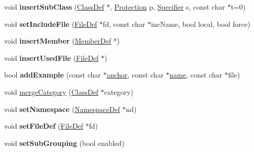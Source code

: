 \begin{DoxyCompactItemize}
\mbox{\label{class_class_def_a842c8a6c817b87f412a50ca58fc1142d}} 
void {\bfseries insert\+Sub\+Class} (\mbox{\hyperlink{class_class_def}{Class\+Def}} $\ast$, \mbox{\hyperlink{types_8h_a90e352184df58cd09455fe9996cd4ded}{Protection}} p, \mbox{\hyperlink{types_8h_ab16236bdd10ddf4d73a9847350f0017e}{Specifier}} s, const char $\ast$t=0)
\item 
\mbox{\label{class_class_def_a54f3cf488b1e3dbb722197c22c9ca6b8}} 
void {\bfseries set\+Include\+File} (\mbox{\hyperlink{class_file_def}{File\+Def}} $\ast$fd, const char $\ast$inc\+Name, bool local, bool force)
\item 
\mbox{\label{class_class_def_a47e87d243d882ef9e05e68259b5e0254}} 
void {\bfseries insert\+Member} (\mbox{\hyperlink{class_member_def}{Member\+Def}} $\ast$)
\item 
\mbox{\label{class_class_def_a87fd3b5ee9194f25f1d6aaf8359c8b54}} 
void {\bfseries insert\+Used\+File} (\mbox{\hyperlink{class_file_def}{File\+Def}} $\ast$)
\item 
\mbox{\label{class_class_def_a009ccc7e1085a853c2a677cbb1d29b05}} 
bool {\bfseries add\+Example} (const char $\ast$\mbox{\hyperlink{class_class_def_af865817aabca93db5792b247ca8dfba6}{anchor}}, const char $\ast$\mbox{\hyperlink{class_definition_a9324000f785d7b6b098878a3bca4df5b}{name}}, const char $\ast$file)
\item 
void \mbox{\hyperlink{class_class_def_a67f89df2361269ef583f33b2ee087a2b}{merge\+Category}} (\mbox{\hyperlink{class_class_def}{Class\+Def}} $\ast$category)
\item 
\mbox{\label{class_class_def_a03f05923f7ecbe5199e0f39d05c83c57}} 
void {\bfseries set\+Namespace} (\mbox{\hyperlink{class_namespace_def}{Namespace\+Def}} $\ast$nd)
\item 
\mbox{\label{class_class_def_a814a32af1fe1d6d901dde4eef0ccfcdd}} 
void {\bfseries set\+File\+Def} (\mbox{\hyperlink{class_file_def}{File\+Def}} $\ast$fd)
\item 
\mbox{\label{class_class_def_aeed0fd23615a98b0cbcc1faf5bcab6bd}} 
void {\bfseries set\+Sub\+Grouping} (bool enabled)

\end{DoxyCompactItemize}
